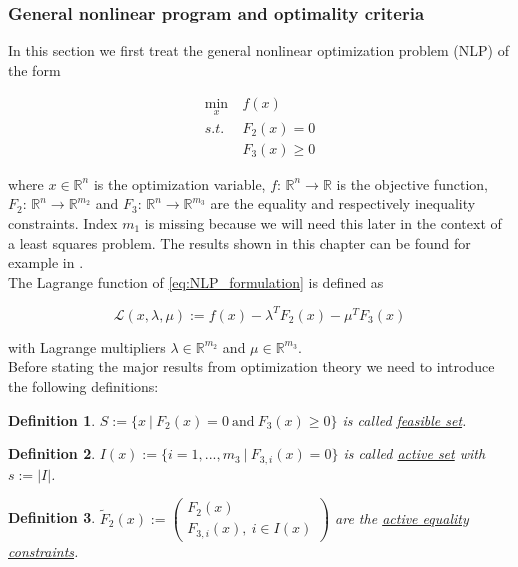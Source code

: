 \documentclass{scrartcl}[12pt, halfparskip]
\numberwithin{equation}{section}
\numberwithin{figure}{section}
\numberwithin{table}{section}
\newtheorem{Definition}{Definition}
\begin{document}
\subsubsection{General nonlinear program and optimality criteria}
\label{sec:optimization_theory_NLP}
In this section we first treat the general nonlinear optimization problem (NLP) of the form

\begin{align}
	\min_x & \ f(x) \label{eq:NLP_formulation} \\
	s.t. & \ F_2(x) = 0 \nonumber \\
	& \ F_3(x) \ge 0 \nonumber
\end{align}

where $x \in \mathbb{R}^n$ is the optimization variable, $f\text{: } \mathbb{R}^n \rightarrow \mathbb{R}$ is the objective function, $F_2\text{: } \mathbb{R}^n \rightarrow \mathbb{R}^{m_2}$ and $F_3\text{: } \mathbb{R}^n \rightarrow \mathbb{R}^{m_3}$ are the equality and respectively inequality constraints. Index $m_1$ is missing because we will need this later in the context of a least squares problem. The results shown in this chapter can be found for example in \cite{nonlinear_optimiziation_wright}. \\

The Lagrange function of \cref{eq:NLP_formulation} is defined as

\begin{equation}
	\mathcal{L}(x,\lambda,\mu) := f(x) - \lambda^T F_2(x) - \mu^T F_3(x)
\end{equation}

with Lagrange multipliers $\lambda \in \mathbb{R}^{m_2}$ and $\mu \in \mathbb{R}^{m_3}$. \\

Before stating the major results from optimization theory we need to introduce the following definitions:

\begin{Definition}
	$S := \{ x \ | \ F_2(x) = 0 \ \text{and} \ F_3(x) \ge 0 \}$ is called \underline{feasible set}.
\end{Definition}

\begin{Definition}
	$I(x) := \{ i=1,...,m_3 \ | \ F_{3,i}(x) = 0 \}$ is called \underline{active set} with $s := \vert I \vert$.
\end{Definition}

\begin{Definition}
	$\tilde{F}_2(x) := 
	\begin{pmatrix}
		F_2(x) \\
		F_{3,i}(x), \ i \in I(x) 
	\end{pmatrix}$
	are the \underline{active equality constraints}.
\end{Definition}
\end{document}
